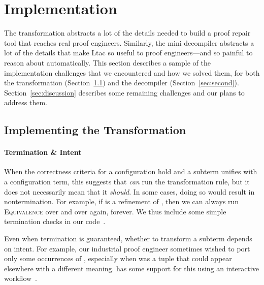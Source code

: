 \section{Implementation}
\label{sec:impl}

The transformation abstracts a lot of the details needed to build a proof repair tool that reaches real proof engineers.
Similarly, the mini decompiler abstracts a lot of the details that make Ltac so useful to proof engineers---and so painful to 
reason about automatically.
This section describes a sample of the implementation challenges that we encountered and how we solved them,
for both the transformation (Section~\ref{sec:implementation}) and the decompiler (Section~\ref{sec:second}).
Section~\ref{sec:discussion} describes some remaining challenges and our plans to address them. %

\subsection{Implementing the Transformation}
\label{sec:implementation}

\paragraph{Termination \& Intent}
When the correctness criteria for a configuration hold and a subterm unifies with a configuration term, this suggests that \toolname \textit{can}
run the transformation rule, but it does not necessarily mean that it \textit{should}.
In some cases, doing so would result in nontermination.
For example, if \B is a refinement of \A, then we can always run \textsc{Equivalence}
over and over again, forever.
We thus include some simple termination checks in our code~. %

Even when termination is guaranteed, whether to transform a subterm depends on intent.
For example, our industrial proof engineer sometimes wished to port only some occurrences of \A,
especially when \A was a tuple that could appear elsewhere
with a different meaning.
\toolname has some support for this using an interactive workflow~. %


